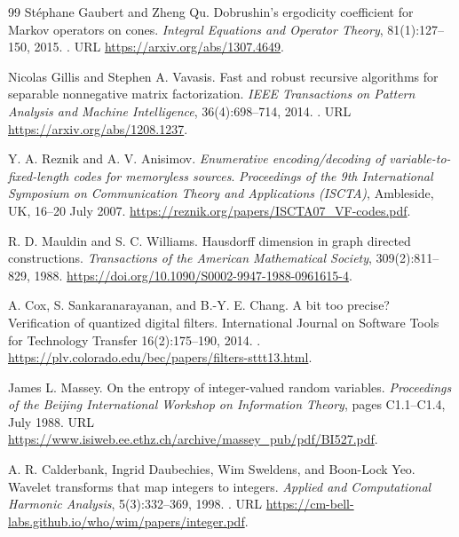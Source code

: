 \begin{thebibliography}{99}
St\'ephane Gaubert and Zheng Qu.
\newblock Dobrushin's ergodicity coefficient for Markov operators on cones.
\newblock \emph{Integral Equations and Operator Theory}, 81(1):127--150, 2015.
\newblock {}.
\newblock URL \url{https://arxiv.org/abs/1307.4649}.

Nicolas Gillis and Stephen A. Vavasis.
\newblock Fast and robust recursive algorithms for separable nonnegative
matrix factorization.
\newblock \emph{IEEE Transactions on Pattern Analysis and Machine
Intelligence}, 36(4):698--714, 2014.
\newblock {}.
\newblock URL \url{https://arxiv.org/abs/1208.1237}.

Y. A. Reznik and A. V. Anisimov. \emph{Enumerative
encoding/decoding of variable-to-fixed-length codes for memoryless sources}.
\emph{Proceedings of the 9th International Symposium on Communication Theory
and Applications (ISCTA)}, Ambleside, UK, 16--20 July 2007.
\url{https://reznik.org/papers/ISCTA07_VF-codes.pdf}.

R. D. Mauldin and S. C. Williams.
Hausdorff dimension in graph directed constructions.
\emph{Transactions of the American Mathematical Society}, 309(2):811--829, 1988.
\url{https://doi.org/10.1090/S0002-9947-1988-0961615-4}.

A. Cox, S. Sankaranarayanan, and B.-Y. E. Chang.
A bit too precise? Verification of quantized digital filters.
International Journal on Software Tools for Technology Transfer
16(2):175--190, 2014.
.
\url{https://plv.colorado.edu/bec/papers/filters-sttt13.html}.

James L. Massey.
\newblock On the entropy of integer-valued random variables.
\newblock \emph{Proceedings of the Beijing International Workshop on
Information Theory}, pages C1.1--C1.4, July 1988.
\newblock URL \url{https://www.isiweb.ee.ethz.ch/archive/massey_pub/pdf/BI527.pdf}.

A. R. Calderbank, Ingrid Daubechies, Wim Sweldens, and Boon-Lock Yeo.
\newblock Wavelet transforms that map integers to integers.
\newblock \emph{Applied and Computational Harmonic Analysis},
5(3):332--369, 1998.
\newblock {}.
\newblock URL \url{https://cm-bell-labs.github.io/who/wim/papers/integer.pdf}.
\end{thebibliography}
